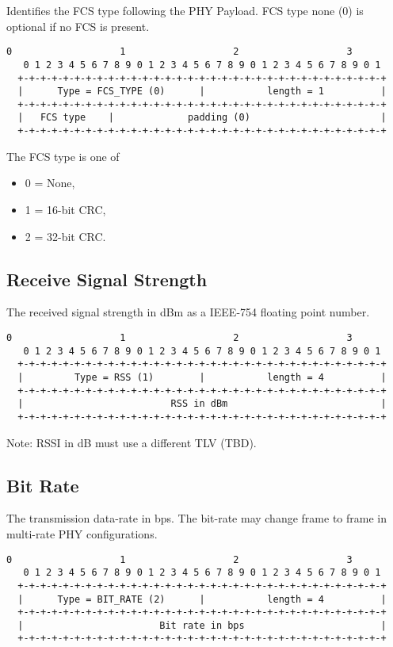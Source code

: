 \documentclass[12pt]{article}
\renewcommand\_{\textunderscore\allowbreak}
\begin{document}
Identifies the FCS type following the PHY Payload.  FCS type none (0) is
optional if no FCS is present.

\begin{Verbatim}[samepage=true]
   0                   1                   2                   3
   0 1 2 3 4 5 6 7 8 9 0 1 2 3 4 5 6 7 8 9 0 1 2 3 4 5 6 7 8 9 0 1
  +-+-+-+-+-+-+-+-+-+-+-+-+-+-+-+-+-+-+-+-+-+-+-+-+-+-+-+-+-+-+-+-+
  |      Type = FCS_TYPE (0)      |           length = 1          |
  +-+-+-+-+-+-+-+-+-+-+-+-+-+-+-+-+-+-+-+-+-+-+-+-+-+-+-+-+-+-+-+-+
  |   FCS type    |             padding (0)                       |
  +-+-+-+-+-+-+-+-+-+-+-+-+-+-+-+-+-+-+-+-+-+-+-+-+-+-+-+-+-+-+-+-+
\end{Verbatim}

The FCS type is one of
    \begin{itemize}
        \item 0 = None,
        \item 1 = 16-bit CRC,
        \item 2 = 32-bit CRC.
    \end{itemize}

\subsection{Receive Signal Strength}
The received signal strength in dBm as a IEEE-754 floating point number.

\begin{Verbatim}[samepage=true]
   0                   1                   2                   3
   0 1 2 3 4 5 6 7 8 9 0 1 2 3 4 5 6 7 8 9 0 1 2 3 4 5 6 7 8 9 0 1
  +-+-+-+-+-+-+-+-+-+-+-+-+-+-+-+-+-+-+-+-+-+-+-+-+-+-+-+-+-+-+-+-+
  |         Type = RSS (1)        |           length = 4          |
  +-+-+-+-+-+-+-+-+-+-+-+-+-+-+-+-+-+-+-+-+-+-+-+-+-+-+-+-+-+-+-+-+
  |                          RSS in dBm                           |
  +-+-+-+-+-+-+-+-+-+-+-+-+-+-+-+-+-+-+-+-+-+-+-+-+-+-+-+-+-+-+-+-+
\end{Verbatim}
Note: RSSI in dB must use a different TLV (TBD).

\newpage
\subsection{Bit Rate}

The transmission data-rate in bps.  The bit-rate may change frame to frame in
multi-rate PHY configurations.

\begin{Verbatim}[samepage=true]
   0                   1                   2                   3
   0 1 2 3 4 5 6 7 8 9 0 1 2 3 4 5 6 7 8 9 0 1 2 3 4 5 6 7 8 9 0 1
  +-+-+-+-+-+-+-+-+-+-+-+-+-+-+-+-+-+-+-+-+-+-+-+-+-+-+-+-+-+-+-+-+
  |      Type = BIT_RATE (2)      |           length = 4          |
  +-+-+-+-+-+-+-+-+-+-+-+-+-+-+-+-+-+-+-+-+-+-+-+-+-+-+-+-+-+-+-+-+
  |                        Bit rate in bps                        |
  +-+-+-+-+-+-+-+-+-+-+-+-+-+-+-+-+-+-+-+-+-+-+-+-+-+-+-+-+-+-+-+-+
\end{Verbatim}
\end{document}
